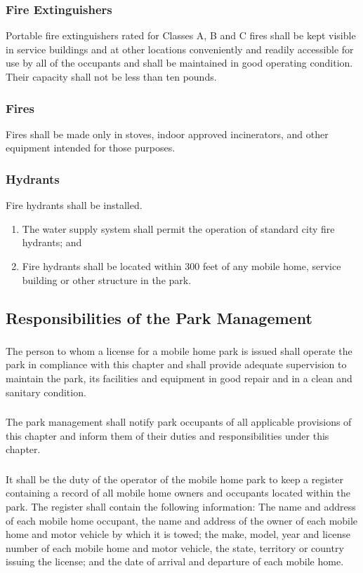 \subsubsection{Fire Extinguishers}
Portable fire extinguishers rated for Classes A, B and C fires shall be kept visible in service buildings and at other locations conveniently and readily accessible for use by all of the occupants and shall be maintained in good operating condition. Their capacity shall not be less than ten pounds.
\subsubsection{Fires}
Fires shall be made only in stoves, indoor approved incinerators, and other equipment intended for those purposes.
\subsubsection{Hydrants}
Fire hydrants shall be installed.  
\begin{enumerate}[{\indent}a)]
    \item The water supply system shall permit the operation of standard city fire hydrants; and 
    \item Fire hydrants shall be located within 300 feet of any mobile home, service building or other structure in the park.
\end{enumerate}
\subsection{Responsibilities of the Park Management}
\subsubsection{}
The person to whom a license for a mobile home park is issued shall operate the park in compliance with this chapter and shall provide adequate supervision to maintain the park, its facilities and equipment in good repair and in a clean and sanitary condition.
\subsubsection{}
The park management shall notify park occupants of all applicable provisions of this chapter and inform them of their duties and responsibilities under this chapter.
\subsubsection{}
It shall be the duty of the operator of the mobile home park to keep a register containing a record of all mobile home owners and occupants located within the park. The register shall contain the following information: The name and address of each mobile home occupant, the name and address of the owner of each mobile home and motor vehicle by which it is towed; the make, model, year and license number of each mobile home and motor vehicle, the state, territory or country issuing the license; and the date of arrival and departure of each mobile home.
